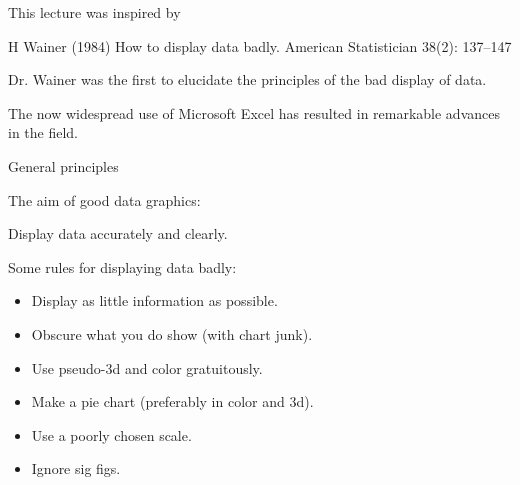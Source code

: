 \documentclass[12pt]{article}
\newcommand{\headsize}{\fontsize{35}{35} \selectfont}
\newcommand{\smallsize}{\fontsize{25}{30} \selectfont}
\newcommand{\smallersize}{\fontsize{20}{25} \selectfont}
\begin{document}
\vspace{30mm}

\color{white}
\smallsize

\hspace{0.5in} \begin{minipage}{9in}
This lecture was inspired by

\vspace{10mm}

\hfill \begin{minipage}{8.5in}
{\smallersize \color{blue}
H Wainer (1984) How to display data badly. American Statistician
38(2): 137--147}
\end{minipage}

\vspace{20mm}

Dr. Wainer was the first to elucidate the principles of the bad
display of data.

\vspace{20mm}

The now widespread use of {\color{pink} Microsoft Excel} has
resulted in remarkable advances in the field.
\end{minipage}

\newpage

\headsize \color{yellow}
\hfill \begin{minipage}{5.75in}
\centering
General principles
\end{minipage}

\vspace{10mm}
\smallsize \color{white}

\hfill \begin{minipage}[t]{10in}
The aim of good data graphics:

\vspace{10mm}

\hfill \begin{minipage}{9.5in}
\smallersize
\color{blue} Display data accurately and clearly.
\end{minipage}

\vspace{30mm}

Some rules for displaying data badly:

\vspace{8mm}

\hfill \begin{minipage}{9.6in}
\color{blue} \smallersize
\begin{itemize}
\item Display as little information as possible.
\item Obscure what you do show (with chart junk).
\item Use pseudo-3d and color gratuitously.
\item Make a pie chart (preferably in color and 3d).
\item Use a poorly chosen scale.
\item Ignore sig figs.
\end{itemize}
\end{minipage}
\end{minipage}
\end{document}
